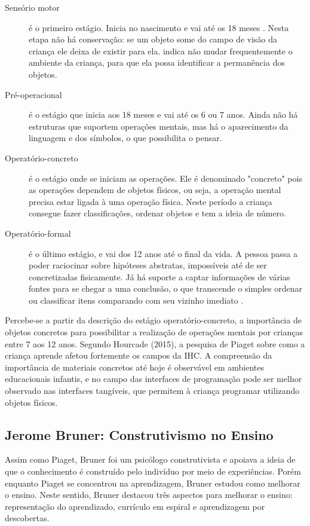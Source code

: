 \begin{description}
\item[Sensório motor] é o primeiro estágio. Inicia no nascimento e vai até os 18 meses \cite{piaget_development_1964}. Nesta etapa não há conservação: se um objeto some do campo de visão da criança ele deixa de existir para ela.  indica não mudar frequentemente o ambiente da criança, para que ela possa identificar a permanência dos objetos.

\item[Pré-operacional] é o estágio que inicia aos 18 meses e vai até os 6 ou 7 anos. Ainda não há estruturas que suportem operações mentais, mas há o aparecimento da linguagem e dos símbolos, o que possibilita o pensar.

\item[Operatório-concreto] é o estágio onde se iniciam as operações. Ele é denominado "concreto" pois as operações dependem de objetos físicos, ou seja, a operação mental precisa estar ligada à uma operação física. Neste período a criança consegue fazer classificações, ordenar objetos e tem a ideia de número.

\item[Operatório-formal] é o último estágio, e vai dos 12 anos até o final da vida. A pessoa passa a poder raciocinar sobre hipóteses abstratas, impossíveis até de ser concretizadas fisicamente. Já há suporte a captar informações de várias fontes para se chegar a uma conclusão, o que transcende o simples ordenar ou classificar itens comparando com seu vizinho imediato \cite{piaget_development_1964}.

\end{description}

Percebe-se a partir da descrição do estágio operatório-concreto, a importância de objetos concretos para possibilitar a realização de operações mentais por crianças entre 7 aos 12 anos. Segundo Hourcade (2015), a pesquisa de Piaget sobre como a criança aprende afetou fortemente os campos da IHC. A compreensão da importância de materiais concretos até hoje é observável em ambientes educacionais infantis, e no campo das interfaces de programação pode ser melhor observado nas interfaces tangíveis, que permitem à criança programar utilizando objetos físicos.

\subsection{Jerome Bruner: Construtivismo no Ensino}
\label{sub_jerome_bruner}
Assim como Piaget, Bruner foi um psicólogo construtivista e apoiava a ideia de que o conhecimento é construído pelo indivíduo por meio de experiências. Porém enquanto Piaget se concentrou na aprendizagem, Bruner estudou como melhorar o ensino. Neste sentido, Bruner destacou três aspectos para melhorar o ensino: representação do aprendizado, currículo em espiral e aprendizagem por descobertas. 

